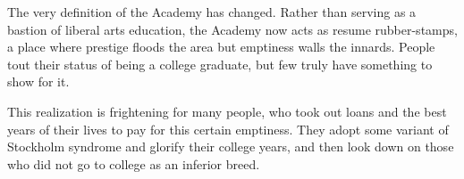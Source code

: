 \documentclass[12pt,letterpaper]{article}
\begin{document}
%
%

The very definition of the Academy has changed.  Rather than serving as a bastion of liberal arts education, the Academy now acts as resume rubber-stamps, a place where prestige floods the area but emptiness walls the innards.  People tout their status of being a college graduate, but few truly have something to show for it.

This realization is frightening for many people, who took out loans and the best years of their lives to pay for this certain emptiness.  They adopt some variant of Stockholm syndrome and glorify their college years, and then look down on those who did not go to college as an inferior breed.





%
%
%

\end{document}
